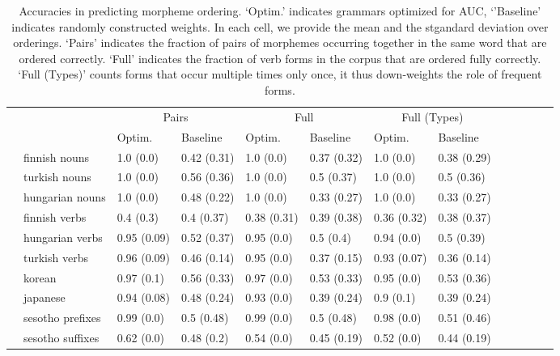 \documentclass[11pt,letterpaper]{article}
\begin{document}
\begin{table}[]
    \centering
    \begin{tabular}{l|l|ll|lllllllll}
    &     &    \multicolumn{2}{c|}{Pairs} & \multicolumn{2}{c|}{Full} & \multicolumn{2}{c}{Full (Types)} \\
     &   &     Optim. & Baseline & Optim. & Baseline & Optim. & Baseline \\ \hline
 & finnish nouns & 1.0 (0.0) & 0.42 (0.31) & 1.0 (0.0) & 0.37 (0.32) & 1.0 (0.0) & 0.38 (0.29) \\
 & turkish nouns & 1.0 (0.0) & 0.56 (0.36) & 1.0 (0.0) & 0.5 (0.37) & 1.0 (0.0) & 0.5 (0.36) \\
 & hungarian nouns & 1.0 (0.0) & 0.48 (0.22) & 1.0 (0.0) & 0.33 (0.27) & 1.0 (0.0) & 0.33 (0.27) \\
 \hline
 & finnish verbs & 0.4 (0.3) & 0.4 (0.37) & 0.38 (0.31) & 0.39 (0.38) & 0.36 (0.32) & 0.38 (0.37) \\
 & hungarian verbs & 0.95 (0.09) & 0.52 (0.37) & 0.95 (0.0) & 0.5 (0.4) & 0.94 (0.0) & 0.5 (0.39) \\
 & turkish verbs & 0.96 (0.09) & 0.46 (0.14) & 0.95 (0.0) & 0.37 (0.15) & 0.93 (0.07) & 0.36 (0.14) \\
 & korean & 0.97 (0.1) & 0.56 (0.33) & 0.97 (0.0) & 0.53 (0.33) & 0.95 (0.0) & 0.53 (0.36) \\
 & japanese & 0.94 (0.08) & 0.48 (0.24) & 0.93 (0.0) & 0.39 (0.24) & 0.9 (0.1) & 0.39 (0.24) \\
 & sesotho prefixes & 0.99 (0.0) & 0.5 (0.48) & 0.99 (0.0) & 0.5 (0.48) & 0.98 (0.0) & 0.51 (0.46) \\
 & sesotho suffixes & 0.62 (0.0) & 0.48 (0.2) & 0.54 (0.0) & 0.45 (0.19) & 0.52 (0.0) & 0.44 (0.19) \\
    \end{tabular}
    \caption{Accuracies in predicting morpheme ordering. `Optim.' indicates grammars optimized for AUC, `'Baseline' indicates randomly constructed weights.
    In each cell, we provide the mean and the stgandard deviation over orderings. `Pairs' indicates the fraction of pairs of morphemes occurring together in the same word that are ordered correctly. `Full' indicates the fraction of verb forms in the corpus that are ordered fully correctly. `Full (Types)' counts forms that occur multiple times only once, it thus down-weights the role of frequent forms.}
    \label{tab:optimized_acc}
\end{table}
\end{document}
